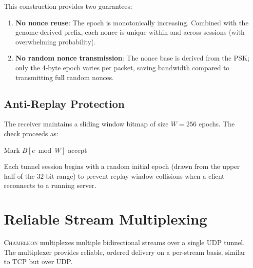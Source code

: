 \documentclass[11pt,a4paper]{article}
\newcommand{\chameleon}{\textsc{Chameleon}}
\begin{document}
This construction provides two guarantees:
\begin{enumerate}[nosep]
  \item \textbf{No nonce reuse}: The epoch is monotonically increasing. Combined with the genome-derived prefix, each nonce is unique within and across sessions (with overwhelming probability).
  \item \textbf{No random nonce transmission}: The nonce base is derived from the PSK; only the 4-byte epoch varies per packet, saving bandwidth compared to transmitting full random nonces.
\end{enumerate}

\subsection{Anti-Replay Protection}\label{sec:replay}

The receiver maintains a sliding window bitmap of size $W = 256$ epochs. The check proceeds as:

\begin{algorithm}[H]
\SetAlgoLined
{}
Mark $B[e \bmod W]$\;
\Return accept\;
\caption{Anti-replay check with sliding window.}
\label{alg:replay}
\end{algorithm}

Each tunnel session begins with a random initial epoch (drawn from the upper half of the 32-bit range) to prevent replay window collisions when a client reconnects to a running server.

\section{Reliable Stream Multiplexing}\label{sec:mux}

\chameleon{} multiplexes multiple bidirectional streams over a single UDP tunnel. The multiplexer provides reliable, ordered delivery on a per-stream basis, similar to TCP but over UDP.
\end{document}
